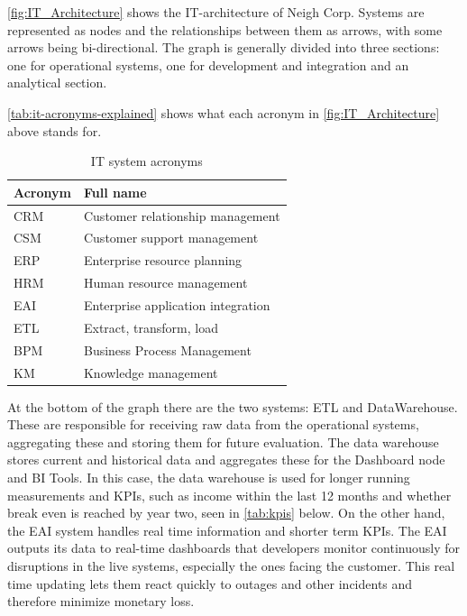 \documentclass{article}
\begin{document}

\autoref{fig:IT_Architecture} shows the IT-architecture of Neigh Corp. Systems are represented as nodes and the relationships between them as arrows, with some arrows being bi-directional. The graph is generally divided into three sections: one for operational systems, one for development and integration and an analytical section.

\autoref{tab:it-acronyms-explained} shows what each acronym in \autoref{fig:IT_Architecture} above stands for.

\begin{table}[H]
    \centering
    \begin{tabular}{l l}
        \toprule
        \textbf{Acronym} & \textbf{Full name} \\
        \midrule
        CRM & Customer relationship management \\
        CSM & Customer support management \\
        ERP & Enterprise resource planning \\
        HRM & Human resource management \\
        EAI & Enterprise application integration \\
        ETL & Extract, transform, load \\
        BPM & Business Process Management \\
        KM & Knowledge management \\
        
        \bottomrule
    \end{tabular}
    \caption{IT system acronyms}
    \label{tab:it-acronyms-explained}
\end{table}

At the bottom of the graph there are the two systems: ETL and DataWarehouse. These are responsible for receiving raw data from the operational systems, aggregating these and storing them for future evaluation. The data warehouse stores current and historical data and aggregates these for the Dashboard node and BI Tools. In this case, the data warehouse is used for longer running measurements and KPIs, such as income within the last 12 months and whether break even is reached by year two, seen in \autoref{tab:kpis} below. On the other hand, the EAI system handles real time information and shorter term KPIs. The EAI outputs its data to real-time dashboards that developers monitor continuously for disruptions in the live systems, especially the ones facing the customer. This real time updating lets them react quickly to outages and other incidents and therefore minimize monetary loss.
\end{document}
